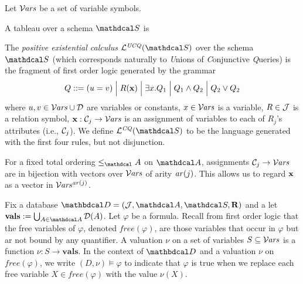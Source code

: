 \documentclass[the-pdg-manual.tex]{subfiles}
\begin{document}
Let $\mathcal V\kern-.65pt\mathit{ars}$ be a set of variable symbols.

\begin{defn}
    A tableau over a schema $\Sch$ is 
\end{defn}

\begin{defn}[CQ,UCQ]
	The \emph{positive existential calculus} $\lang{UCQ}(\Sch)$ over the schema $\Sch$ (which corresponds naturally to \emph Unions of \emph Conjunctive \emph Queries) is the fragment of first order logic generated by the grammar
	\begin{align*}
		 Q ::= (u=v) \mathrel{\Big|} R(\mathbf x)  \mathrel{\Big|} \exists x. Q_1 \mathrel{\Big|} Q_1 \land Q_2 \mathrel{\Big|} Q_2 \lor Q_2  
	\end{align*}
	where $u,v \in \mathcal V\kern-.65pt\mathit{ars} \cup {\mathcal D}$ are variables
	or constants, $x \in \mathcal V\kern-.65pt\mathit{ars}$ is a variable,
	$R \in \mathcal J$ is a relation symbol, $\mathbf x  : \mathcal C_j \to {\mathcal V\kern-.65pt\mathit{ars}}$ is an assignment of variables to each of $R_j$'s attributes (i.e., $\mathcal C_j$). We define $\lang{CQ}(\Sch)$ to be the language generated with the first four rules, but not disjunction.
\end{defn}
	

\begin{inactive}
	For a fixed total ordering $\leq_\Attrs$ on $\Attrs$, assignments $\mathcal C_j \to \mathcal V\kern-.65pt\mathit{ars}$ are in bijection with vectors over $\mathcal V\kern-.65pt\mathit{ars}$ of arity $\mathit{ar}(j)$. This allows us to regard $\mathbf x$ as a vector in $\mathcal V\kern-.65pt\mathit{ars}^{\mathit{ar}(j)}$. 
\end{inactive}
Fix a database $\D = (\Idx,\Attrs,\Sch,\Rels)$ and a let $\vals := \bigcup_{A \in \Attrs}\Doms(A)$. Let $\varphi$ be a formula. 
Recall from first order logic that the free variables of $\varphi$, denoted $\mathit{free}(\varphi)$, are those variables that occur in $\varphi$ but ar not bound by any quantifier.
A valuation $\nu$ on a set of variables $S \subseteq \mathcal V\kern-.65pt\mathit{ars}$ is a function $\nu: S \to \mathbf{vals}$. 
In the context of $\D$ and a valuation $\nu$ on $\mathit{free}(\varphi)$, we write $(D,\nu) \models \varphi$ to indicate that $\varphi$ is true when we replace each free variable $X \in \mathit{free}(\varphi)$ with the value $\nu(X)$. %
\end{document}
